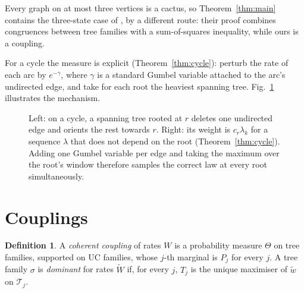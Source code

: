 \documentclass[11pt]{amsart}
\theoremstyle{definition}
\newtheorem{definition}[theorem]{Definition}
\theoremstyle{remark}
\newcommand{\T}{\mathcal T}
\begin{document}
Every graph on at most three vertices is a cactus, so Theorem~\ref{thm:main} contains the three-state case of \cite{FH2026}, by a different route: their proof combines congruences between tree families with a sum-of-squares inequality, while ours is a coupling.

For a cycle the measure is explicit (Theorem~\ref{thm:cycle}): perturb the rate of each arc by $e^{-\gamma}$, where $\gamma$ is a standard Gumbel variable attached to the arc's undirected edge, and take for each root the heaviest spanning tree. Fig.~\ref{fig:ring} illustrates the mechanism.

\begin{figure}[ht]
\centering
{}
\caption{Left: on a cycle, a spanning tree rooted at $r$ deletes one undirected edge and orients the rest towards $r$. Right: its weight is $c_r\lambda_k$ for a sequence $\lambda$ that does not depend on the root (Theorem~\ref{thm:cycle}). Adding one Gumbel variable per edge and taking the maximum over the root's window therefore samples the correct law at every root simultaneously.}
\label{fig:ring}
\end{figure}

\section{Couplings}

\begin{definition}
A \emph{coherent coupling} of rates $W$ is a probability measure $\Theta$ on tree families, supported on UC families, whose $j$-th marginal is $P_j$ for every $j$. A tree family $\sigma$ is \emph{dominant} for rates $\widetilde W$ if, for every $j$, $T_j$ is the unique maximiser of $\widetilde w$ on $\T_j$.
\end{definition}
\end{document}
